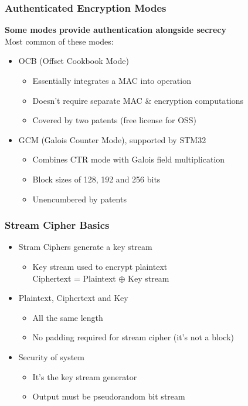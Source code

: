 \subsubsection{Authenticated Encryption Modes}
\textbf{Some modes provide authentication alongside secrecy}\\
Most common of these modes:
\begin{itemize}
  \item OCB (Offset Cookbook Mode)
  \begin{itemize}
    \item Essentially integrates a MAC into operation
    \item Doesn't require separate MAC \& encryption computations
    \item Covered by two patents (free license for OSS)
  \end{itemize}
  \item GCM (Galois Counter Mode), supported by STM32
  \begin{itemize}
    \item Combines CTR mode with Galois field multiplication
    \item Block sizes of 128, 192 and 256 bits
    \item Unencumbered by patents
  \end{itemize}
\end{itemize}

\subsubsection{Stream Cipher Basics}
\begin{itemize}
  \item Stram Ciphers generate a key stream
  \begin{itemize}
    \item Key stream used to encrypt plaintext\\
    Ciphertext = Plaintext $\oplus$ Key stream
  \end{itemize}
  \item Plaintext, Ciphertext and Key
  \begin{itemize}
    \item All the same length
    \item No padding required for stream cipher (it's not a block)
  \end{itemize}
  \item Security of system
  \begin{itemize}
    \item It's the key stream generator
    \item Output must be pseudorandom bit stream
  \end{itemize}
\end{itemize}

